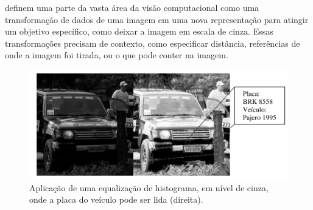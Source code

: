  definem uma parte da vasta área da visão computacional como uma transformação de dados de uma imagem em uma nova representação para atingir um objetivo específico, como deixar a imagem em escala de cinza. Essas transformações precisam de contexto, como especificar distância, referências de onde a imagem foi tirada, ou o que pode conter na imagem.
\begin{figure}[h]
	\caption{\label{fig:grayscaleex}Aplicação de uma equalização de histograma, em nível de cinza, onde a placa do veículo pode ser lida (direita).}
	\begin{center}
	    \includegraphics[width=.7\textwidth]{resources/grayscaleex}
	\end{center}
\end{figure}


